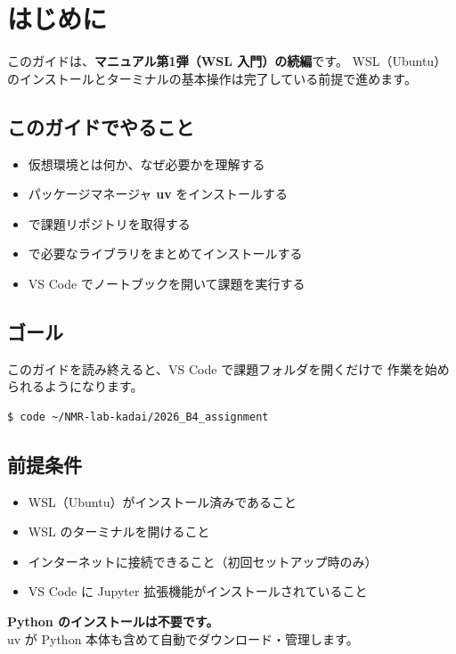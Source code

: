 \chapter{はじめに}

このガイドは、\textbf{マニュアル第1弾（WSL 入門）の続編}です。
WSL（Ubuntu）のインストールとターミナルの基本操作は完了している前提で進めます。

\section{このガイドでやること}

\begin{itemize}
  \item 仮想環境とは何か、なぜ必要かを理解する
  \item パッケージマネージャ \textbf{uv} をインストールする
  \item {} で課題リポジトリを取得する
  \item {} で必要なライブラリをまとめてインストールする
  \item VS Code でノートブックを開いて課題を実行する
\end{itemize}

\section{ゴール}

このガイドを読み終えると、VS Code で課題フォルダを開くだけで
作業を始められるようになります。

\begin{wslbox}
\begin{lstlisting}[style=bash]
$ code ~/NMR-lab-kadai/2026_B4_assignment
\end{lstlisting}
\end{wslbox}

\section{前提条件}

\begin{itemize}
  \item WSL（Ubuntu）がインストール済みであること
  \item WSL のターミナルを開けること
  \item インターネットに接続できること（初回セットアップ時のみ）
  \item VS Code に Jupyter 拡張機能がインストールされていること
\end{itemize}

\begin{notebox}
\textbf{Python のインストールは不要です。}\\
uv が Python 本体も含めて自動でダウンロード・管理します。
\end{notebox}
